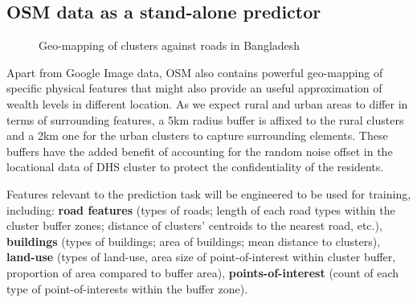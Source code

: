 \documentclass[solid,math,chem,code,plot,gloss]{bmc}
\begin{document}
\subsection{OSM data as a stand-alone predictor}

\begin{figure}[!tbp]
  \centering
  \hfill
  \caption{Geo-mapping of clusters against roads in Bangladesh}
\end{figure}



Apart from Google Image data, OSM also contains powerful geo-mapping of specific physical features that might also provide an useful approximation of wealth levels in different location. As we expect rural and urban areas to differ in terms of surrounding features, a 5km radius buffer is affixed to the rural clusters and a 2km one for the urban clusters to capture surrounding elements. These buffers have the added benefit of accounting for the random noise offset in the locational data of DHS cluster to protect the confidentiality of the residents. 

Features relevant to the prediction task will be engineered to be used for training, including: \textbf{road features} (types of roads; length of each road types within the cluster buffer zones; distance of clusters' centroids to the nearest road, etc.), \textbf{buildings} (types of buildings; area of buildings; mean distance to clusters), \textbf{land-use} (types of land-use, area size of point-of-interest within cluster buffer, proportion of area compared to buffer area), \textbf{points-of-interest} (count of each type of point-of-interests within the buffer zone). 
\end{document}
